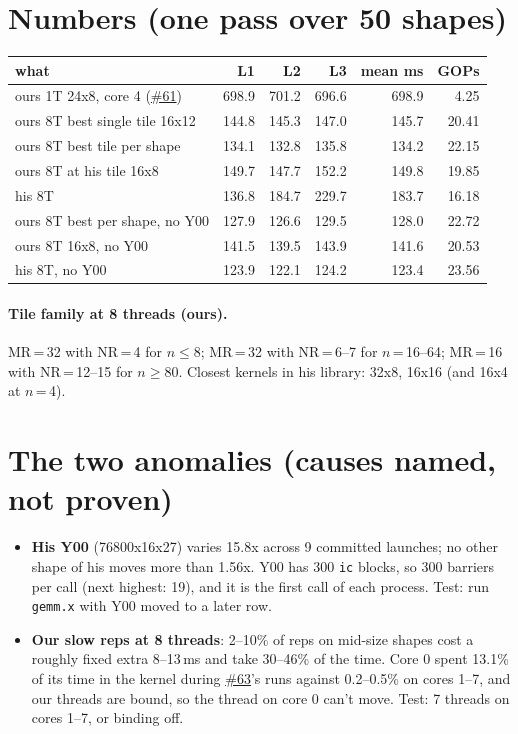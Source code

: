 \documentclass[10pt,a4paper]{article}
\newcommand{\iss}[1]{\href{https://github.com/JieGH/RVV_code_gen_via_MLIR_xDSL/issues/#1}{\##1}}
\begin{document}
\section*{Numbers (one pass over 50 shapes)}
\begin{tabular}{@{}l r r r r r@{}}
\toprule
what & L1 & L2 & L3 & mean ms & GOPs \\
\midrule
ours 1T 24x8, core 4 (\iss{61}) & 698.9 & 701.2 & 696.6 & 698.9 & 4.25 \\
ours 8T best single tile 16x12 & 144.8 & 145.3 & 147.0 & 145.7 & 20.41 \\
ours 8T best tile per shape & 134.1 & 132.8 & 135.8 & 134.2 & 22.15 \\
ours 8T at his tile 16x8 & 149.7 & 147.7 & 152.2 & 149.8 & 19.85 \\
his 8T & 136.8 & 184.7 & 229.7 & 183.7 & 16.18 \\
\midrule
ours 8T best per shape, no Y00 & 127.9 & 126.6 & 129.5 & 128.0 & 22.72 \\
ours 8T 16x8, no Y00 & 141.5 & 139.5 & 143.9 & 141.6 & 20.53 \\
his 8T, no Y00 & 123.9 & 122.1 & 124.2 & 123.4 & 23.56 \\
\bottomrule
\end{tabular}

\paragraph{Tile family at 8 threads (ours).} MR\,=\,32 with NR\,=\,4 for $n \le 8$; MR\,=\,32 with NR\,=\,6--7 for
$n$\,=\,16--64; MR\,=\,16 with NR\,=\,12--15 for $n \ge 80$. Closest kernels in his library: 32x8, 16x16 (and 16x4 at $n$\,=\,4).

\section*{The two anomalies (causes named, not proven)}
\begin{itemize}
\item \textbf{His Y00} (76800x16x27) varies 15.8x across 9 committed launches; no other shape of his moves more than
1.56x. Y00 has 300 \texttt{ic} blocks, so 300 barriers per call (next highest: 19), and it is the first call of
each process. Test: run \texttt{gemm.x} with Y00 moved to a later row.
\item \textbf{Our slow reps at 8 threads}: 2--10\% of reps on mid-size shapes cost a roughly fixed extra 8--13\,ms and
take 30--46\% of the time. Core 0 spent 13.1\% of its time in the kernel during \iss{63}'s runs against 0.2--0.5\% on
cores 1--7, and our threads are bound, so the thread on core 0 can't move. Test: 7 threads on cores 1--7, or binding off.
\end{itemize}
\end{document}
